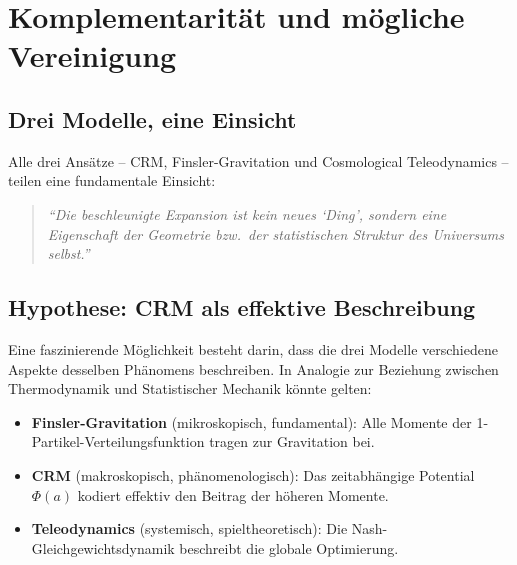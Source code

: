 \documentclass[aps,prd,twocolumn,superscriptaddress,nofootinbib]{revtex4-2}
\begin{document}
\section{Komplementarität und mögliche Vereinigung}
\label{sec:complementarity}

\subsection{Drei Modelle, eine Einsicht}

Alle drei Ansätze -- CRM, Finsler-Gravitation und Cosmological Teleodynamics -- teilen eine fundamentale Einsicht:
\begin{quote}
\textit{``Die beschleunigte Expansion ist kein neues `Ding', sondern eine Eigenschaft der Geometrie bzw.\ der statistischen Struktur des Universums selbst.''}
\end{quote}

\subsection{Hypothese: CRM als effektive Beschreibung}

Eine faszinierende Möglichkeit besteht darin, dass die drei Modelle verschiedene Aspekte desselben Phänomens beschreiben. In Analogie zur Beziehung zwischen Thermodynamik und Statistischer Mechanik könnte gelten:

\begin{itemize}
\item \textbf{Finsler-Gravitation} (mikroskopisch, fundamental): Alle Momente der 1-Partikel-Verteilungsfunktion tragen zur Gravitation bei.
\item \textbf{CRM} (makroskopisch, phänomenologisch): Das zeitabhängige Potential $\Phi(a)$ kodiert effektiv den Beitrag der höheren Momente.
\item \textbf{Teleodynamics} (systemisch, spieltheoretisch): Die Nash-Gleichgewichtsdynamik beschreibt die globale Optimierung.
\end{itemize}
\end{document}
